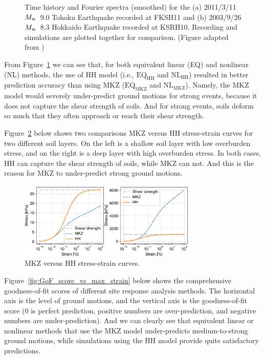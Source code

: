 \documentclass[11pt,letterpaper]{article}
\begin{document}
\begin{figure}[H]
    \caption{Time history and Fourier spectra (smoothed) for the (a) 2011/3/11 $M_{\rm{w}}$~9.0 Tohoku Earthquake recorded at FKSH11 and (b) 2003/9/26 $M_{\rm{w}}$~8.3 Hokkaido Earthquake recorded at KSRH10. Recording and simulations are plotted together for comparison. (Figure adapted from \citealp{Shi_Asimaki_2017})}
    \label{fig:2003_and_2011_events}
\end{figure}

From Figure~\ref{fig:2003_and_2011_events} we can see that, for both equivalent linear (EQ) and nonlinear (NL) methods, the use of HH model (i.e., $\mathrm{EQ}_{\mathrm{HH}}$ and $\mathrm{NL}_{\mathrm{HH}}$) resulted in better prediction accuracy than using MKZ ($\mathrm{EQ}_{\mathrm{MKZ}}$ and $\mathrm{NL}_{\mathrm{MKZ}}$). Namely, the MKZ model would severely under-predict ground motions for strong events, because it does not capture the shear strength of soils. And for strong events, soils deform so much that they often approach or reach their shear strength.

Figure~\ref{fig:MKZ_vs_HH_curves} below shows two comparisons MKZ versus HH stress-strain curves for two different soil layers. On the left is a shallow soil layer with low overburden stress, and on the right is a deep layer with high overburden stress. In both cases, HH can capture the shear strength of soils, while MKZ can not. And this is the reason for MKZ to under-predict strong ground motions.

\begin{figure}[H]
    \centering
    \includegraphics[width=0.76\textwidth]{MKZ_vs_HH_curves__a403.pdf}
    \caption{MKZ versus HH stress-strain curves.}
    \label{fig:MKZ_vs_HH_curves}
\end{figure}

Figure~\ref{fig:GoF_score_vs_max_strain} below shows the comprehensive goodness-of-fit scores of different site response analysis methods. The horizontal axis is the level of ground motions, and the vertical axis is the goodness-of-fit score (0 is perfect prediction, positive numbers are over-prediction, and negative numbers are under-prediction). And we can clearly see that equivalent linear or nonlinear methods that use the MKZ model under-predicts medium-to-strong ground motions, while simulations using the HH model provide quite satisfactory predictions.
\end{document}
